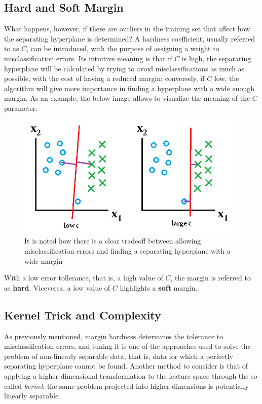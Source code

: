 \subsection{Hard and Soft Margin}

What happens, however, if there are outliers in the training set that affect how the separating hyperplane is determined? A hardness coefficient, usually referred to as $C$, can be introduced, with the purpose of assigning a weight to misclassification errors. Its intuitive meaning is that if $C$ is high, the separating hyperplane will be calculated by trying to avoid misclassifications as much as possible, with the cost of having a reduced margin; conversely, if $C$ low, the algorithm will give more importance in finding a hyperplane with a wide enough margin. As an example, the below image allows to visualize the meaning of the $C$ parameter.

\begin{figure}[h]
    \centering
    \includegraphics[scale=0.75]{images/svm/hardness-vs-softness.png}
    \caption{It is noted how there is a clear tradeoff between allowing misclassification errors and finding a separating hyperplane with a wide margin}
    \label{fig:svm_hard_soft_margin}
\end{figure}

With a low error tollerance, that is, a high value of $C$, the margin is referred to as \textbf{hard}. Viceversa, a low value of $C$ highlights a \textbf{soft} margin.


\subsection{Kernel Trick and Complexity}\label{svm_kernel_trick_and_complexity}

As previously mentioned, margin hardness determines the tolerance to misclassification errors, and tuning it is one of the approaches used to solve the problem of non-linearly separable data, that is, data for which a perfectly separating hyperplane cannot be found. Another method to consider is that of applying a higher dimensional transformation to the feature space through the so called \textit{kernel}: the same problem projected into higher dimensions is potentially linearly separable.

